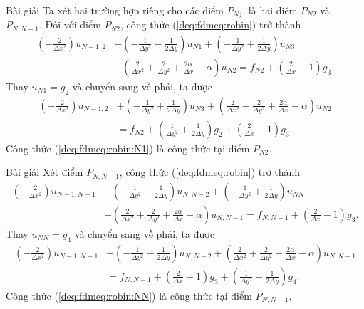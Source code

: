 \documentclass[9pt]{beamer}
\numberwithin{equation}{section}
\begin{document}
\begin{frame}
\begin{exampleblock}{Bài giải}
    Ta xét hai trường hợp riêng cho các điểm $P_{Nj}$, là hai điểm $P_{N2}$ và $P_{N,N-1}$. Đối với điểm $P_{N2}$, công thức (\ref{deq:fdmeq:robin}) trở thành
    \begin{align*}
        \left(-\frac{2}{\Delta x^2}\right) u_{N-1,2} &+
        \left(-\frac{1}{\Delta y^2} - \frac{1}{2\Delta y}\right) u_{N1} +
        \left(-\frac{1}{\Delta y^2} + \frac{1}{2\Delta y}\right) u_{N3} \nonumber \\ &+ 
        \left(\frac{2}{\Delta x^2} + \frac{2}{\Delta y^2} + \frac{2\alpha}{\Delta x} - \alpha\right) u_{N2} =
        f_{N2} + \left(\frac{2}{\Delta x} - 1\right) g_3. 
    \end{align*}
    Thay $u_{N1} = g_2$ và chuyển sang về phải, ta được
    \begin{align}
        \left(-\frac{2}{\Delta x^2}\right) u_{N-1,2} &+
        \left(-\frac{1}{\Delta y^2} + \frac{1}{2\Delta y}\right) u_{N3} + 
        \left(\frac{2}{\Delta x^2} + \frac{2}{\Delta y^2} + \frac{2\alpha}{\Delta x} - \alpha\right) u_{N2} \nonumber \\ &=
        f_{N2} + 
        \left(\frac{1}{\Delta y^2} + \frac{1}{2\Delta y}\right) g_2 +
        \left(\frac{2}{\Delta x} - 1\right) g_3. \label{deq:fdmeq:robin:N1}
    \end{align}
    Công thức (\ref{deq:fdmeq:robin:N1}) là công thức tại điểm $P_{N2}$.
\end{exampleblock}
\end{frame}

\begin{frame}
\begin{exampleblock}{Bài giải}
    Xét điểm $P_{N,N-1}$, công thức (\ref{deq:fdmeq:robin}) trở thành
    \begin{align*}
        \left(-\frac{2}{\Delta x^2}\right) u_{N-1,N-1} &+
        \left(-\frac{1}{\Delta y^2} - \frac{1}{2\Delta y}\right) u_{N,N-2} +
        \left(-\frac{1}{\Delta y^2} + \frac{1}{2\Delta y}\right) u_{NN} \nonumber \\ &+ 
        \left(\frac{2}{\Delta x^2} + \frac{2}{\Delta y^2} + \frac{2\alpha}{\Delta x} - \alpha\right) u_{N,N-1} =
        f_{N,N-1} + \left(\frac{2}{\Delta x} - 1\right) g_3.
    \end{align*}
    Thay $u_{NN} = g_4$ và chuyển sang về phải, ta được
    \begin{align}
        \left(-\frac{2}{\Delta x^2}\right) u_{N-1,N-1} &+
        \left(-\frac{1}{\Delta y^2} - \frac{1}{2\Delta y}\right) u_{N,N-2} +
        \left(\frac{2}{\Delta x^2} + \frac{2}{\Delta y^2} + \frac{2\alpha}{\Delta x} - \alpha\right) u_{N,N-1} \nonumber \\ &=
        f_{N,N-1} + \left(\frac{2}{\Delta x} - 1\right) g_3 +
        \left(\frac{1}{\Delta y^2} - \frac{1}{2\Delta y}\right) g_4. \label{deq:fdmeq:robin:NN}
    \end{align}
    Công thức (\ref{deq:fdmeq:robin:NN}) là công thức tại điểm $P_{N,N-1}$.
\end{exampleblock}
\end{frame}
\end{document}
